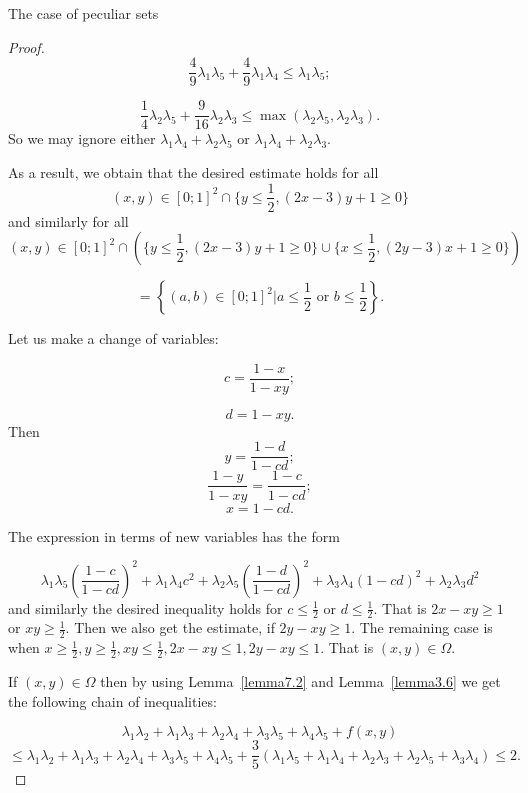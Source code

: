 \documentclass[12pt]{article}
\begin{document}
\begin{section}{ The case of peculiar sets}
\begin{proof}
        $$
             \frac{4}{9}\lambda_{1}\lambda_{5} + \frac{4}{9}\lambda_{1}\lambda_{4}\leq \lambda_{1}\lambda_{5};
        $$

        $$
            \frac{1}{4}\lambda_{2}\lambda_{5} + \frac{9}{16}\lambda_{2}\lambda_{3} \leq \max (\lambda_{2}\lambda_{5}, \lambda_{2}\lambda_{3} ).
        $$
        So we may ignore either $\lambda_{1}\lambda_{4} + \lambda_{2}\lambda_{5}$ or $\lambda_{1}\lambda_{4} + \lambda_{2}\lambda_{3}$. 

        As a result, we obtain that the desired estimate holds for all $$
            (x,y) \in [0;1]^{2}\cap \{ y\leq \frac{1}{2}, (2x-3)y+1\geq0\} 
        $$
        and similarly for all 
        $$
            (x,y) \in [0;1]^{2}\cap \left(\{ y\leq \frac{1}{2}, (2x-3)y+1\geq0\}\cup \{ x\leq \frac{1}{2}, (2y-3)x+1\geq0\}\right) $$
            
            $$= \left\{(a,b)\in[0;1]^{2} | a\leq \frac{1}{2} \text{ or } b\leq \frac{1}{2} \right\}.
        $$

        Let us make a change of variables:

        $$
            c  = \frac{1-x}{1-xy};
        $$

        $$
            d  = 1-xy.
        $$
        Then  
        $$
            y = \frac{1-d}{1-cd};
        $$
        $$
            \frac{1-y}{1-xy} = \frac{1-c}{1-cd};
        $$
        $$
            x = 1- cd.
        $$

        The expression in terms of new variables has the form

         $$
            \lambda_{1}\lambda_{5}\left(\frac{1-c}{1-cd}\right)^2 + \lambda_{1}\lambda_{4} c^2 + \lambda_{2}\lambda_{5}\left(\frac{1-d}{1-cd}\right)^2 + \lambda_{3}\lambda_{4}(1-cd)^{2} + \lambda_{2}\lambda_{3}d^2
        $$
        and similarly the desired inequality holds for $c\leq \frac{1}{2}$ or $d\leq \frac{1}{2}$. That is $2x - xy \geq 1$ or $xy\geq \frac{1}{2}$.  Then we also get the estimate,  if $2y-xy\geq 1$.  The remaining case is when $x\geq \frac{1}{2}, y\geq \frac{1}{2}, xy\leq \frac{1}{2}, 2x-xy\leq 1, 2y-xy\leq 1$. That is $(x,y)\in \Omega.$

        If $(x,y)\in\Omega$ then by using Lemma~\ref{lemma7.2} and Lemma~\ref{lemma3.6} we get the following chain of inequalities:

        $$
            \lambda_{1}\lambda_{2} + \lambda_{1}\lambda_{3} +  \lambda_{2}\lambda_{4} + \lambda_{3}\lambda_{5} + \lambda_{4}\lambda_{5} + f(x,y) 
        $$
        $$
            \leq   \lambda_{1}\lambda_{2} + \lambda_{1}\lambda_{3} + \lambda_{2}\lambda_{4} +\lambda_{3}\lambda_{5} + \lambda_{4}\lambda_{5} + \frac{3}{5}(\lambda_{1}\lambda_{5} + \lambda_{1}\lambda_{4} +\lambda_{2}\lambda_{3} + \lambda_{2}\lambda_{5} + \lambda_{3}\lambda_{4} ) \leq 2.
        $$  
        

\end{proof}
\end{section}
\end{document}
